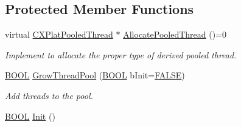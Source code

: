\subsection*{\-Protected \-Member \-Functions}
\begin{DoxyCompactItemize}
\item 
virtual \hyperlink{class_c_x_plat_pooled_thread}{\-C\-X\-Plat\-Pooled\-Thread} $\ast$ \hyperlink{class_c_x_plat_thread_pool_a139b514b9f7111e2dadceca5a066b870}{\-Allocate\-Pooled\-Thread} ()=0
\begin{DoxyCompactList}\small\item\em \-Implement to allocate the proper type of derived pooled thread. \end{DoxyCompactList}\item 
\hyperlink{_cpclient_8h_a3be13892ae7076009afcf121347dd319}{\-B\-O\-O\-L} \hyperlink{class_c_x_plat_thread_pool_aea64ec56b3a96b208967d981ec396a2a}{\-Grow\-Thread\-Pool} (\hyperlink{_cpclient_8h_a3be13892ae7076009afcf121347dd319}{\-B\-O\-O\-L} b\-Init=\hyperlink{_x_plat_8h_aa93f0eb578d23995850d61f7d61c55c1}{\-F\-A\-L\-S\-E})
\begin{DoxyCompactList}\small\item\em \-Add threads to the pool. \end{DoxyCompactList}\item 
\hyperlink{_cpclient_8h_a3be13892ae7076009afcf121347dd319}{\-B\-O\-O\-L} \hyperlink{class_c_x_plat_thread_pool_ac5a354175af9cd8b981cec195f399681}{\-Init} ()
\end{DoxyCompactItemize}
